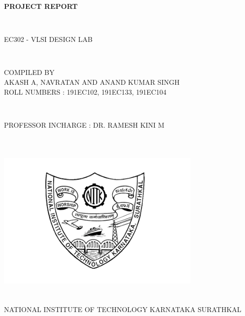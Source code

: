 \documentclass[12pt]{report}
\begin{document}
	\begin{center}
	\hspace{0pt}
	\vfill
		\vspace{50pt}
		\begin{Huge}
			\textbf{PROJECT REPORT}
		\end{Huge}
		\\
		\vspace{30pt}
		\begin{huge}
			EC302 - VLSI DESIGN LAB
		\end{huge}
		\\
		\vspace{30pt}
		\begin{Large}
			COMPILED BY \\ \vspace{3pt} AKASH A, NAVRATAN AND ANAND KUMAR SINGH \\ \vspace{11pt} ROLL NUMBERS : 191EC102, 191EC133, 191EC104
		\end{Large}
		\\
		\vspace{30pt}
		\begin{Large}
			PROFESSOR INCHARGE : DR. RAMESH KINI M
		\end{Large}
		\\
		\vspace{30pt}
		\includegraphics[width = 10cm, height = 8cm]{NITK-Surathkal}
		\\
		\begin{large}
			NATIONAL INSTITUTE OF TECHNOLOGY KARNATAKA SURATHKAL
		\end{large}
	\vfill
	\hspace{0pt}
	\end{center}
	
	\newpage
	
\end{document}
